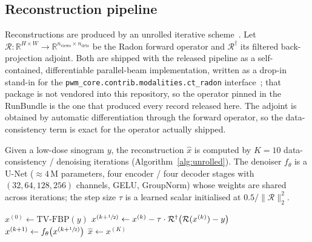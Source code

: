 \documentclass{article}
\newcommand{\R}{\mathbb{R}}
\begin{document}
\subsection{Reconstruction pipeline}
\label{sec:method_overview}
Reconstructions are produced by an unrolled iterative
scheme~\citep{adler2018learned,mardani2018neural}. Let $\mathcal{R}:
\R^{H \times W} \to \R^{n_{\textrm{views}} \times n_{\textrm{dets}}}$ be
the Radon forward operator and $\mathcal{R}^\dagger$ its filtered
back-projection adjoint. Both are shipped with the released pipeline as a
self-contained, differentiable parallel-beam implementation, written as a
drop-in stand-in for the \texttt{pwm\_core.contrib.modalities.ct\_radon}
interface~\citep{pwmcore}; that package is not vendored into this
repository, so the operator pinned in the RunBundle is the one that
produced every record released here. The adjoint is obtained by automatic
differentiation through the forward operator, so the data-consistency term
is exact for the operator actually shipped.

Given a low-dose sinogram $y$, the reconstruction $\hat{x}$ is computed by
$K=10$ data-consistency / denoising iterations
(Algorithm~\ref{alg:unrolled}). The denoiser $f_\theta$ is a U-Net
($\approx 4$\,M parameters, four encoder / four decoder stages with
$(32,64,128,256)$ channels, GELU, GroupNorm) whose weights are shared
across iterations; the step size $\tau$ is a learned scalar initialised at
$0.5/\|\mathcal{R}\|_2^2$.

\begin{algorithm}[h]
    \caption{Unrolled iterative reconstruction (per ensemble member)}
    \label{alg:unrolled}
    \begin{algorithmic}[1]
        \State $x^{(0)} \gets \textrm{TV-FBP}(y)$ 
            \State $x^{(k+\sfrac{1}{2})} \gets x^{(k)} - \tau \cdot \mathcal{R}^\dagger \!\left( \mathcal{R}(x^{(k)}) - y \right)$ 
            \State $x^{(k+1)} \gets f_\theta\!\left( x^{(k+\sfrac{1}{2})} \right)$ 
        \EndFor
        \State \Return $\hat{x} \gets x^{(K)}$
    \end{algorithmic}
\end{algorithm}
\end{document}
